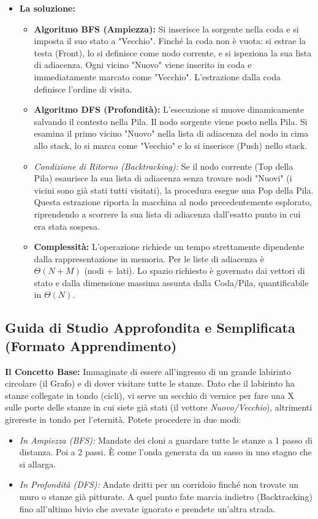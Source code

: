 \documentclass[a4paper, 11pt]{report}
\begin{document}
\begin{itemize}
\item \textbf{La soluzione:}
\begin{itemize}
    \item \textbf{Algoritmo BFS (Ampiezza):}
    Si inserisce la sorgente nella coda e si imposta il suo stato a "Vecchio".
    Finché la coda non è vuota: si estrae la testa (Front), lo si definisce come nodo corrente, e si ispeziona la sua lista di adiacenza. Ogni vicino "Nuovo" viene inserito in coda e immediatamente marcato come "Vecchio". L'estrazione dalla coda definisce l'ordine di visita.
    \item \textbf{Algoritmo DFS (Profondità):}
    L'esecuzione si muove dinamicamente salvando il contesto nella Pila. Il nodo sorgente viene posto nella Pila. Si esamina il primo vicino "Nuovo" nella lista di adiacenza del nodo in cima allo stack, lo si marca come "Vecchio" e lo si inserisce (Push) nello stack.
    \item \textit{Condizione di Ritorno (Backtracking):} Se il nodo corrente (Top della Pila) esaurisce la sua lista di adiacenza senza trovare nodi "Nuovi" (i vicini sono già stati tutti visitati), la procedura esegue una Pop della Pila. Questa estrazione riporta la macchina al nodo precedentemente esplorato, riprendendo a scorrere la sua lista di adiacenza dall'esatto punto in cui era stata sospesa.
    \item \textbf{Complessità:} L'operazione richiede un tempo strettamente dipendente dalla rappresentazione in memoria. Per le liste di adiacenza è $\Theta(N+M)$ (nodi + lati). Lo spazio richiesto è governato dai vettori di stato e dalla dimensione massima assunta dalla Coda/Pila, quantificabile in $\Theta(N)$.
\end{itemize}
\end{itemize}

\vspace{0.5cm}
\subsection*{Guida di Studio Approfondita e Semplificata (Formato Apprendimento)}



\textbf{Il Concetto Base:}
Immaginate di essere all'ingresso di un grande labirinto circolare (il Grafo) e di dover visitare tutte le stanze. Dato che il labirinto ha stanze collegate in tondo (cicli), vi serve un secchio di vernice per fare una X sulle porte delle stanze in cui siete già stati (il vettore \textit{Nuovo/Vecchio}), altrimenti girereste in tondo per l'eternità.
Potete procedere in due modi:
\begin{itemize}
\item \textit{In Ampiezza (BFS):} Mandate dei cloni a guardare tutte le stanze a 1 passo di distanza. Poi a 2 passi. È come l'onda generata da un sasso in uno stagno che si allarga.
\item \textit{In Profondità (DFS):} Andate dritti per un corridoio finché non trovate un muro o stanze già pitturate. A quel punto fate marcia indietro (Backtracking) fino all'ultimo bivio che avevate ignorato e prendete un'altra strada.
\end{itemize}
\end{document}
